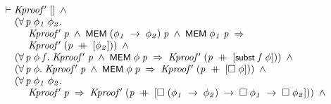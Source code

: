 \documentclass[letterpaper]{article}
\renewcommand{\HOLConst}[1]{{\textsf{\upshape\small #1}}}
\newenvironment{holmath}{\begin{displaymath}\begin{array}{l}}{\end{array}\end{displaymath}\ignorespacesafterend}
\begin{document}
\begin{holmath}
  \ensuremath{\HOLTokenTurnstile}\HOLFreeVar{Kproof\sp{\prime}}\;[]\;\HOLSymConst{\HOLTokenConj{}}\\
\;\;\;\;\;(\HOLSymConst{\HOLTokenForall{}}\HOLBoundVar{p}\;\HOLBoundVar{\ensuremath{\phi\sb{1}}}\;\HOLBoundVar{\ensuremath{\phi\sb{2}}}.\\
\;\;\;\;\;\;\;\;\;\;\HOLFreeVar{Kproof\sp{\prime}}\;\HOLBoundVar{p}\;\HOLSymConst{\HOLTokenConj{}}\;\HOLConst{MEM}\;(\HOLBoundVar{\ensuremath{\phi\sb{1}}}\;\HOLSymConst{\ensuremath{\rightarrow}}\;\HOLBoundVar{\ensuremath{\phi\sb{2}}})\;\HOLBoundVar{p}\;\HOLSymConst{\HOLTokenConj{}}\;\HOLConst{MEM}\;\HOLBoundVar{\ensuremath{\phi\sb{1}}}\;\HOLBoundVar{p}\;\HOLSymConst{\HOLTokenImp{}}\\
\;\;\;\;\;\;\;\;\;\;\HOLFreeVar{Kproof\sp{\prime}}\;(\HOLBoundVar{p}\;\HOLSymConst{\HOLTokenDoublePlus}\;[\HOLBoundVar{\ensuremath{\phi\sb{2}}}]))\;\HOLSymConst{\HOLTokenConj{}}\\
\;\;\;\;\;(\HOLSymConst{\HOLTokenForall{}}\HOLBoundVar{p}\;\HOLBoundVar{\ensuremath{\phi}}\;\HOLBoundVar{f}.\;\HOLFreeVar{Kproof\sp{\prime}}\;\HOLBoundVar{p}\;\HOLSymConst{\HOLTokenConj{}}\;\HOLConst{MEM}\;\HOLBoundVar{\ensuremath{\phi}}\;\HOLBoundVar{p}\;\HOLSymConst{\HOLTokenImp{}}\;\HOLFreeVar{Kproof\sp{\prime}}\;(\HOLBoundVar{p}\;\HOLSymConst{\HOLTokenDoublePlus}\;[\HOLConst{subst}\;\HOLBoundVar{f}\;\HOLBoundVar{\ensuremath{\phi}}]))\;\HOLSymConst{\HOLTokenConj{}}\\
\;\;\;\;\;(\HOLSymConst{\HOLTokenForall{}}\HOLBoundVar{p}\;\HOLBoundVar{\ensuremath{\phi}}.\;\HOLFreeVar{Kproof\sp{\prime}}\;\HOLBoundVar{p}\;\HOLSymConst{\HOLTokenConj{}}\;\HOLConst{MEM}\;\HOLBoundVar{\ensuremath{\phi}}\;\HOLBoundVar{p}\;\HOLSymConst{\HOLTokenImp{}}\;\HOLFreeVar{Kproof\sp{\prime}}\;(\HOLBoundVar{p}\;\HOLSymConst{\HOLTokenDoublePlus}\;[\HOLSymConst{\ensuremath{\Box}}\;\HOLBoundVar{\ensuremath{\phi}}]))\;\HOLSymConst{\HOLTokenConj{}}\\
\;\;\;\;\;(\HOLSymConst{\HOLTokenForall{}}\HOLBoundVar{p}\;\HOLBoundVar{\ensuremath{\phi\sb{1}}}\;\HOLBoundVar{\ensuremath{\phi\sb{2}}}.\\
\;\;\;\;\;\;\;\;\;\;\HOLFreeVar{Kproof\sp{\prime}}\;\HOLBoundVar{p}\;\HOLSymConst{\HOLTokenImp{}}\;\HOLFreeVar{Kproof\sp{\prime}}\;(\HOLBoundVar{p}\;\HOLSymConst{\HOLTokenDoublePlus}\;[\HOLSymConst{\ensuremath{\Box}}\;(\HOLBoundVar{\ensuremath{\phi\sb{1}}}\;\HOLSymConst{\ensuremath{\rightarrow}}\;\HOLBoundVar{\ensuremath{\phi\sb{2}}})\;\HOLSymConst{\ensuremath{\rightarrow}}\;\HOLSymConst{\ensuremath{\Box}}\;\HOLBoundVar{\ensuremath{\phi\sb{1}}}\;\HOLSymConst{\ensuremath{\rightarrow}}\;\HOLSymConst{\ensuremath{\Box}}\;\HOLBoundVar{\ensuremath{\phi\sb{2}}}]))\;\HOLSymConst{\HOLTokenConj{}}\\

\end{holmath}
\end{document}
